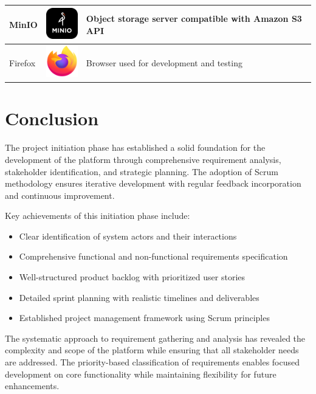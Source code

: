 \begin{longtable}{|m{3.5cm}|m{4cm}|m{6.5cm}|}
    \hline
    MinIO & \includegraphics[width=1.5cm]{pictures/web/logo/minio.png} & Object storage server compatible with Amazon S3 API \\
    \hline
    Firefox & \includegraphics[width=1.5cm]{pictures/web/logo/firefox.png} & Browser used for development and testing \\
    \hline
    \end{longtable}
       
    

\section{Conclusion}

The project initiation phase has established a solid foundation for the development of the platform through comprehensive requirement analysis, stakeholder identification, and strategic planning. The adoption of Scrum methodology ensures iterative development with regular feedback incorporation and continuous improvement.

Key achievements of this initiation phase include:
\begin{itemize}
    \item Clear identification of system actors and their interactions
    \item Comprehensive functional and non-functional requirements specification
    \item Well-structured product backlog with prioritized user stories
    \item Detailed sprint planning with realistic timelines and deliverables
    \item Established project management framework using Scrum principles
\end{itemize}

The systematic approach to requirement gathering and analysis has revealed the complexity and scope of the platform while ensuring that all stakeholder needs are addressed. The priority-based classification of requirements enables focused development on core functionality while maintaining flexibility for future enhancements.


